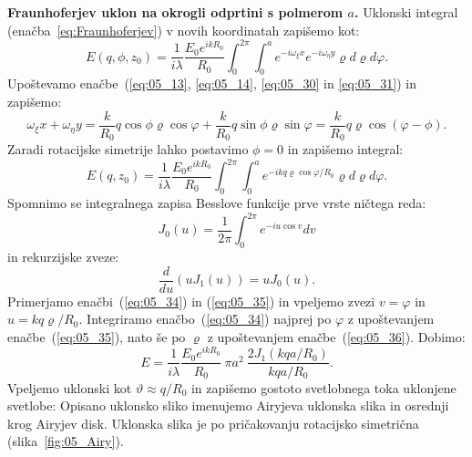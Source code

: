 \begin{example}{\bf Fraunhoferjev uklon na okrogli odprtini s polmerom $a$.}
Uklonski integral (enačba~\ref{eq:Fraunhoferjev}) v novih koordinatah zapišemo kot:
\begin{equation}
E(q,\phi,z_0) = \frac{1}{i\lambda} \frac{E_0e^{ikR_0}}{R_0}\int_0^{2\pi} \int_0^a
e^{-i\omega_\xi x}e^{-i\omega_\eta y}\varrho d\varrho d\varphi.
\label{eq:05_32}
\end{equation}
Upoštevamo enačbe~(\ref{eq:05_13}, \ref{eq:05_14}, \ref{eq:05_30} in \ref{eq:05_31}) in zapišemo:
\begin{equation}
\omega_\xi x + \omega_\eta y= \frac{k}{R_0}q\cos \phi \varrho \cos\varphi + 
\frac{k}{R_0}q\sin \phi \varrho \sin\varphi = 
 \frac{k}{R_0} q\varrho\cos(\varphi - \phi).
\label{eq:05_33}
\end{equation}
Zaradi rotacijske simetrije lahko postavimo $\phi=0$ in zapišemo integral:
\begin{equation}
E(q,z_0) = \frac{1}{i\lambda} \frac{E_0e^{ikR_0}}{R_0}\int_0^{2\pi} \int_0^a
e^{-ikq\varrho \cos\varphi/R_0} \varrho d\varrho d\varphi.
\label{eq:05_34}
\end{equation}
Spomnimo se integralnega zapisa Besslove funkcije prve vrste ničtega reda:
\begin{equation}
J_0(u) = \frac{1}{2\pi} \int_0^{2\pi} e^{-iu\cos v }dv
\label{eq:05_35}
\end{equation}
in rekurzijske zveze:
\begin{equation}
\frac{d}{du}\left( u J_1(u)\right) = u J_{0}(u).
\label{eq:05_36}
\end{equation}
Primerjamo enačbi~(\ref{eq:05_34}) in (\ref{eq:05_35}) in vpeljemo
zvezi $v = \varphi$ in $u = kq\varrho/R_0$. Integriramo enačbo~(\ref{eq:05_34}) 
najprej po $\varphi$ z upoštevanjem enačbe~(\ref{eq:05_35}), nato še po $\varrho$
z upoštevanjem enačbe~(\ref{eq:05_36}). Dobimo:
\begin{equation}
E = \frac{1}{i\lambda}\frac{E_0 e^{ikR_0}}{R_0}~\pi a^2~\frac{2 J_1 (kqa/R_0)}{kqa/R_0}.
\label{eq:05_37}
\end{equation}
Vpeljemo uklonski kot $\vartheta \approx q/R_0$ in zapišemo gostoto svetlobnega toka
uklonjene svetlobe:
Opisano uklonsko sliko imenujemo Airyjeva uklonska slika 
in osrednji krog Airyjev disk.
Uklonska slika je  po pričakovanju rotacijsko simetrična (slika~\ref{fig:05_Airy}).  
\begin{figure}[ht]
\centering
\centering

\end{figure}
\end{example}
